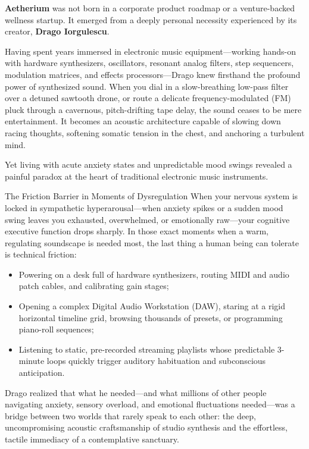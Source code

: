 \documentclass[11pt,oneside,openany]{book}
\begin{document}
\textbf{Aetherium} was not born in a corporate product roadmap or a venture-backed wellness startup. It emerged from a deeply personal necessity experienced by its creator, \textbf{Drago Iorgulescu}.

Having spent years immersed in electronic music equipment---working hands-on with hardware synthesizers, oscillators, resonant analog filters, step sequencers, modulation matrices, and effects processors---Drago knew firsthand the profound power of synthesized sound. When you dial in a slow-breathing low-pass filter over a detuned sawtooth drone, or route a delicate frequency-modulated (FM) pluck through a cavernous, pitch-drifting tape delay, the sound ceases to be mere entertainment. It becomes an acoustic architecture capable of slowing down racing thoughts, softening somatic tension in the chest, and anchoring a turbulent mind.

Yet living with acute anxiety states and unpredictable mood swings revealed a painful paradox at the heart of traditional electronic music instruments.

\begin{sanctuarybox}{The Friction Barrier in Moments of Dysregulation}
When your nervous system is locked in sympathetic hyperarousal---when anxiety spikes or a sudden mood swing leaves you exhausted, overwhelmed, or emotionally raw---your cognitive executive function drops sharply. In those exact moments when a warm, regulating soundscape is needed most, the last thing a human being can tolerate is technical friction:
\begin{itemize}
  \item Powering on a desk full of hardware synthesizers, routing MIDI and audio patch cables, and calibrating gain stages;
  \item Opening a complex Digital Audio Workstation (DAW), staring at a rigid horizontal timeline grid, browsing thousands of presets, or programming piano-roll sequences;
  \item Listening to static, pre-recorded streaming playlists whose predictable 3-minute loops quickly trigger auditory habituation and subconscious anticipation.
\end{itemize}
\end{sanctuarybox}

Drago realized that what he needed---and what millions of other people navigating anxiety, sensory overload, and emotional fluctuations needed---was a bridge between two worlds that rarely speak to each other: the deep, uncompromising acoustic craftsmanship of studio synthesis and the effortless, tactile immediacy of a contemplative sanctuary.
\end{document}
